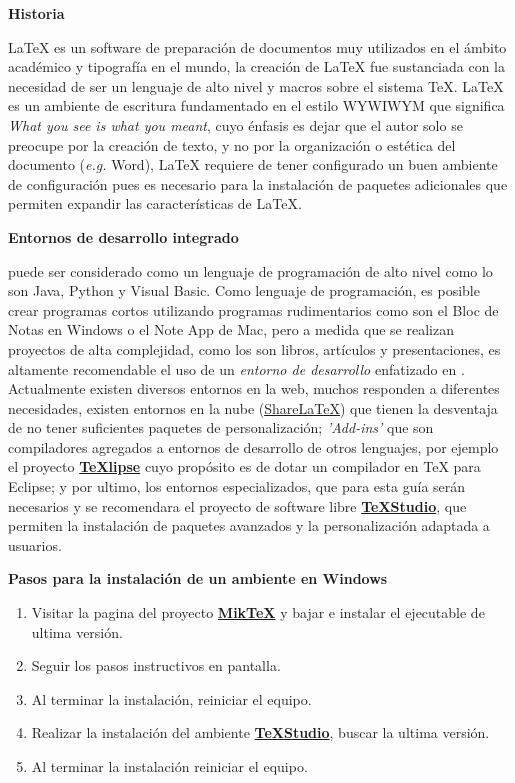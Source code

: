\textbf{Historia}

 \LaTeX{} es un software de preparación de documentos muy utilizados en el ámbito académico y tipografía en el mundo, la creación de \LaTeX{} fue sustanciada con la necesidad de ser un lenguaje de alto nivel y macros sobre el sistema \TeX{}. \LaTeX{}  es un ambiente de escritura fundamentado en el estilo WYWIWYM que significa \emph{What you see is what you meant}, cuyo énfasis es dejar que el autor solo se preocupe por la creación de texto, y no por la organización o estética del documento (\emph{e.g.} Word), \LaTeX{} requiere de tener configurado un buen ambiente de configuración pues es necesario para la instalación de paquetes adicionales que permiten expandir las características de \LaTeX{}. 
 
 \textbf{Entornos de desarrollo integrado}
 
\LaTeXe{}   puede ser considerado como un lenguaje de programación de alto nivel como lo son Java, Python y Visual Basic. Como lenguaje de programación, es posible crear programas cortos utilizando programas rudimentarios como son el Bloc de Notas en Windows o el Note App de Mac, pero a medida que se realizan proyectos de alta complejidad, como los son libros, artículos y presentaciones, es altamente recomendable el uso de un \emph{entorno de desarrollo } enfatizado en \LaTeXe{}. Actualmente existen diversos entornos en la web, muchos responden a diferentes necesidades, existen entornos en la nube (\href{https://www.sharelatex.com}{ShareLaTeX}) que tienen la desventaja de no tener suficientes paquetes de personalización; \emph{'Add-ins'} que son compiladores agregados a entornos de desarrollo de otros lenguajes, por ejemplo el proyecto \href{texlipse.sourceforge.net}{\textbf{TeXlipse}} cuyo propósito es de dotar un compilador en \TeX{} para Eclipse; y por ultimo, los entornos especializados, que para esta guía serán necesarios y se recomendara el proyecto de software libre \href{http://texstudio.sourceforge.net/}{\textbf{\TeX Studio}}, que permiten la instalación de paquetes avanzados y la personalización adaptada a usuarios.

\textbf{Pasos para la instalación de un ambiente en Windows}

\begin{enumerate}
	\item Visitar la pagina del proyecto \href{http://miktex.org/download}{ \textbf{Mik\TeX{}}} y bajar e instalar el ejecutable de ultima versión.
	\item Seguir los pasos instructivos en pantalla.
	\item Al terminar la instalación, reiniciar el equipo.
	\item  Realizar la instalación del ambiente \href{http://texstudio.sourceforge.net/}{\textbf{\TeX Studio}}, buscar la ultima versión.
	\item Al terminar la instalación reiniciar el equipo.
\end{enumerate}

